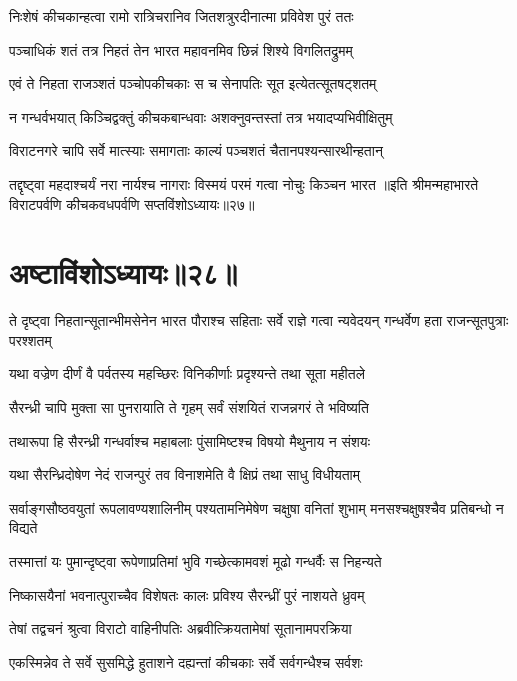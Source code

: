 \twolineshloka
{निःशेषं कीचकान्हत्वा रामो रात्रिचरानिव}
{जितशत्रुरदीनात्मा प्रविवेश पुरं ततः}

\twolineshloka
{पञ्चाधिकं शतं तत्र निहतं तेन भारत}
{महावनमिव छिन्नं शिश्ये विगलितद्रुमम्}

\twolineshloka
{एवं ते निहता राजञ्शतं पञ्चोपकीचकाः}
{स च सेनापतिः सूत इत्येतत्सूतषट्शतम्}

\twolineshloka
{न गन्धर्वभयात् किञ्चिद्वक्तुं कीचकबान्धवाः}
{अशक्नुवन्तस्तां तत्र भयादप्यभिवीक्षितुम्}

\twolineshloka
{विराटनगरे चापि सर्वे मात्स्याः समागताः}
{काल्यं पञ्चशतं चैतानपश्यन्सारथीन्हतान्}

\twolineshloka
{तद्दृष्ट्वा महदाश्चर्यं नरा नार्यश्च नागराः}
{विस्मयं परमं गत्वा नोचुः किञ्चन भारत}
॥इति श्रीमन्महाभारते विराटपर्वणि कीचकवधपर्वणि सप्तविंशोऽध्यायः॥२७॥

\chapter{अष्टाविंशोऽध्यायः॥२८॥ }

\threelineshloka
{ते दृष्ट्वा निहतान्सूतान्भीमसेनेन भारत}
{पौराश्च सहिताः सर्वे राज्ञे गत्वा न्यवेदयन्}
{गन्धर्वेण हता राजन्सूतपुत्राः परश्शतम्}


\twolineshloka
{यथा वज्रेण दीर्णं वै पर्वतस्य महच्छिरः}
{विनिकीर्णाः प्रदृश्यन्ते तथा सूता महीतले}


\twolineshloka
{सैरन्ध्री चापि मुक्ता सा पुनरायाति ते गृहम्}
{सर्वं संशयितं राजन्नगरं ते भविष्यति}


\twolineshloka
{तथारूपा हि सैरन्ध्री गन्धर्वाश्च महाबलाः}
{पुंसामिष्टश्च विषयो मैथुनाय न संशयः}


\twolineshloka
{यथा सैरन्ध्रिदोषेण नेदं राजन्पुरं तव}
{विनाशमेति वै क्षिप्रं तथा साधु विधीयताम्}


\threelineshloka
{सर्वाङ्गसौष्ठवयुतां रूपलावण्यशालिनीम्}
{पश्यतामनिमेषेण चक्षुषा वनितां शुभाम्}
{मनसश्चक्षुषश्चैव प्रतिबन्धो न विद्यते}


\twolineshloka
{तस्मात्तां यः पुमान्दृष्ट्वा रूपेणाप्रतिमां भुवि}
{गच्छेत्कामवशं मूढो गन्धर्वैः स निहन्यते}


\twolineshloka
{निष्कासयैनां भवनात्पुराच्चैव विशेषतः}
{कालः प्रविश्य सैरन्ध्रीं पुरं नाशयते ध्रुवम्}



\twolineshloka
{तेषां तद्वचनं श्रुत्वा विराटो वाहिनीपतिः}
{अब्रवीत्क्रियतामेषां सूतानामपरक्रिया}


\twolineshloka
{एकस्मिन्नेव ते सर्वे सुसमिद्धे हुताशने}
{दह्यन्तां कीचकाः सर्वे सर्वगन्धैश्च सर्वशः}


